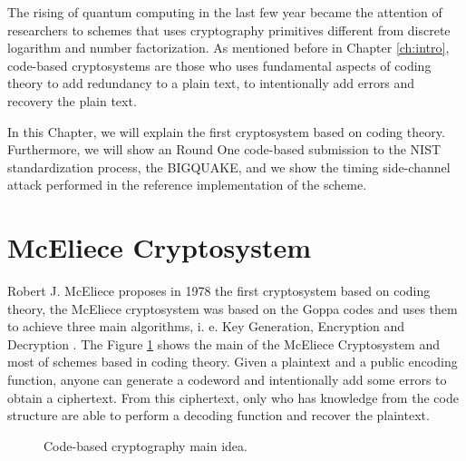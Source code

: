 The rising of quantum computing in the last few year became the attention of researchers to schemes that uses cryptography primitives different from discrete logarithm and number factorization. As mentioned before in Chapter \ref{ch:intro}, code-based cryptosystems are those who uses fundamental aspects of coding theory to add redundancy to a plain text, to intentionally add errors and recovery the plain text. 

In this Chapter, we will explain the first cryptosystem based on coding theory. Furthermore, we will show an Round One code-based submission to the NIST standardization process, the BIGQUAKE, and we show the timing side-channel attack performed in the reference implementation of the scheme.

\section{McEliece Cryptosystem}
Robert J. McEliece proposes in 1978 the first cryptosystem based on coding theory, the McEliece cryptosystem was based on the Goppa codes and uses them to achieve three main algorithms, i. e. Key Generation, Encryption and Decryption \cite{mceliece1978public}. The Figure \ref{fig:code-idea} shows the main of the McEliece Cryptosystem and most of schemes based in coding theory. Given a plaintext and a public encoding function, anyone can generate a codeword and intentionally add some errors to obtain a ciphertext. From this ciphertext, only who has knowledge from the code structure are able to perform a decoding function and recover the plaintext.


\begin{figure}
    \centering
    \label{fig:code-idea}
    \caption{Code-based cryptography main idea.}
\end{figure}

